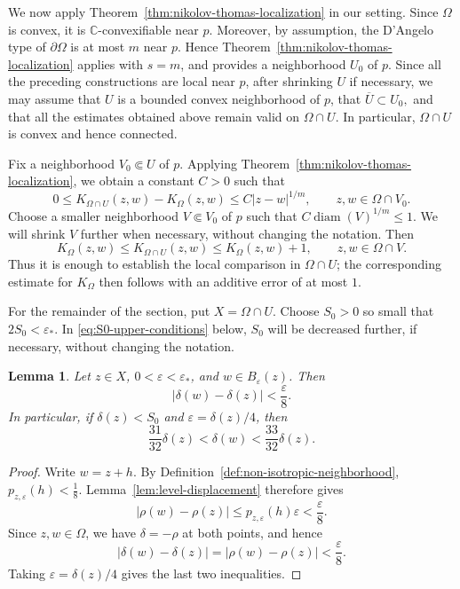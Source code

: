 \documentclass[11pt]{article}
\newtheorem{lemma}[theorem]{Lemma}
\theoremstyle{definition}
\newcommand{\C}{\mathbb{C}}
\newcommand{\eps}{\varepsilon}
\begin{document}
We now apply Theorem~\ref{thm:nikolov-thomas-localization} in our setting.  Since \(\Omega\) is
convex, it is \(\C\)-convexifiable near \(p\).
Moreover, by
assumption, the D'Angelo type of \(\partial\Omega\) is at most \(m\) near
\(p\).  Hence Theorem~\ref{thm:nikolov-thomas-localization} applies with
\(s=m\), and provides a neighborhood \(U_0\) of \(p\).
Since all the preceding constructions are local near \(p\), after shrinking
\(U\) if necessary, we may assume that \(U\) is a bounded convex
neighborhood of \(p\), that
\(
\overline{U}\subset U_0,
\)
and that all the estimates obtained above remain valid on \(\Omega\cap U\).
In particular, \(\Omega\cap U\) is convex and hence connected.

Fix a neighborhood \(V_0\Subset U\) of \(p\).  Applying
Theorem~\ref{thm:nikolov-thomas-localization}, we obtain a constant \(C>0\)
such that
\[
0
\le
K_{\Omega\cap U}(z,w)-K_\Omega(z,w)
\le
C|z-w|^{1/m},
\qquad
z,w\in\Omega\cap V_0.
\]
Choose a smaller neighborhood \(V\Subset V_0\) of \(p\) such that
\(C\operatorname{diam}(V)^{1/m}\le1\).
We will shrink \(V\) further when necessary, without changing the notation.
Then
\begin{equation}\label{eq:localization}
	K_\Omega(z,w)
	\le
	K_{\Omega\cap U}(z,w)
	\le
	K_\Omega(z,w)+1,
	\qquad
	z,w\in\Omega\cap V.
\end{equation}
Thus it is enough to establish the local comparison in \(\Omega\cap U\);
the corresponding estimate for \(K_\Omega\) then follows with an additive
error of at most \(1\).

For the remainder of the section, put \(X=\Omega\cap U\).  Choose
\(S_0>0\) so small that \(2S_0<\eps_*\).
In \eqref{eq:S0-upper-conditions} below, \(S_0\) will be decreased further,
if necessary, without changing the notation.
\begin{lemma}\label{lem:depth-stability}
Let \(z\in X\), \(0<\eps<\eps_*\), and
\(w\in B_\eps(z)\).  Then
\begin{equation*}
 |\delta(w)-\delta(z)|<\frac{\eps}{8}.
\end{equation*}
In particular, if \(\delta(z)<S_0\) and
\(\eps=\delta(z)/4\), then
\[
 \frac{31}{32}\delta(z)
 <
 \delta(w)
 <
 \frac{33}{32}\delta(z).
\]
\end{lemma}

\begin{proof}
Write \(w=z+h\).  By Definition~\ref{def:non-isotropic-neighborhood},
\(
 p_{z,\eps}(h)<\frac18.
\)
Lemma~\ref{lem:level-displacement} therefore gives
\[
 |\rho(w)-\rho(z)|
 \le p_{z,\eps}(h)\eps
 <\frac{\eps}{8}.
\]
Since \(z,w\in\Omega\), we have \(\delta=-\rho\) at both points, and
hence
\[
 |\delta(w)-\delta(z)|
 =
 |\rho(w)-\rho(z)|
 <\frac{\eps}{8}.
\]
Taking \(\eps=\delta(z)/4\) gives the last two inequalities.
\end{proof}
\end{document}
